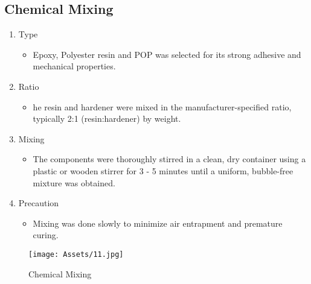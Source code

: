 \subsection{Chemical Mixing}
\begin{enumerate}
	\item  Type
	      \begin{itemize}
		      \item Epoxy, Polyester resin and POP was selected for its strong adhesive and mechanical properties.
	      \end{itemize}
	\item Ratio
	      \begin{itemize}
		      \item he resin and hardener were mixed in the manufacturer-specified ratio, typically 2:1 (resin:hardener) by weight.
	      \end{itemize}
	\item  Mixing
	      \begin{itemize}
		      \item The components were thoroughly stirred in a clean, dry container using a plastic or wooden stirrer for 3 - 5 minutes until a uniform, bubble-free mixture was obtained.
	      \end{itemize}
	\item  Precaution
	      \begin{itemize}
		      \item Mixing was done slowly to minimize air entrapment and premature curing.
	      \end{itemize}
\end{enumerate}

\begin{figure}[H]
	\centering
	\texttt{[image: Assets/11.jpg]}
	\caption{Chemical Mixing}
	\label{fig:placeholder}
\end{figure}


